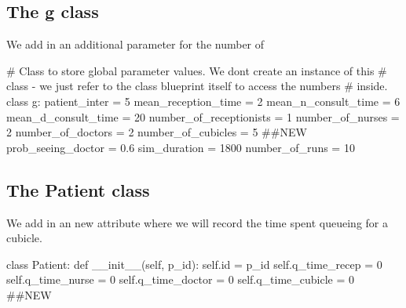 \documentclass[
  letterpaper,
  DIV=11,
  numbers=noendperiod]{scrreprt}
\newenvironment{Shaded}{}{}
\newcommand{\BuiltInTok}[1]{\textcolor[rgb]{0.84,0.23,0.29}{#1}}
\newcommand{\CommentTok}[1]{\textcolor[rgb]{0.42,0.45,0.49}{#1}}
\newcommand{\DecValTok}[1]{\textcolor[rgb]{0.00,0.36,0.77}{#1}}
\newcommand{\FloatTok}[1]{\textcolor[rgb]{0.00,0.36,0.77}{#1}}
\newcommand{\FunctionTok}[1]{\textcolor[rgb]{0.44,0.26,0.76}{#1}}
\newcommand{\KeywordTok}[1]{\textcolor[rgb]{0.84,0.23,0.29}{#1}}
\newcommand{\NormalTok}[1]{\textcolor[rgb]{0.14,0.16,0.18}{#1}}
\newcommand{\OperatorTok}[1]{\textcolor[rgb]{0.14,0.16,0.18}{#1}}
\newcommand{\VariableTok}[1]{\textcolor[rgb]{0.89,0.38,0.04}{#1}}
\begin{document}
\subsection{The g class}\label{the-g-class-9}

We add in an additional parameter for the number of

\begin{Shaded}
\begin{Highlighting}[]
\CommentTok{\# Class to store global parameter values.  We don\textquotesingle{}t create an instance of this}
\CommentTok{\# class {-} we just refer to the class blueprint itself to access the numbers}
\CommentTok{\# inside.}
\KeywordTok{class}\NormalTok{ g:}
\NormalTok{    patient\_inter }\OperatorTok{=} \DecValTok{5}
\NormalTok{    mean\_reception\_time }\OperatorTok{=} \DecValTok{2}
\NormalTok{    mean\_n\_consult\_time }\OperatorTok{=} \DecValTok{6}
\NormalTok{    mean\_d\_consult\_time }\OperatorTok{=} \DecValTok{20}
\NormalTok{    number\_of\_receptionists }\OperatorTok{=} \DecValTok{1}
\NormalTok{    number\_of\_nurses }\OperatorTok{=} \DecValTok{2}
\NormalTok{    number\_of\_doctors }\OperatorTok{=} \DecValTok{2}
\NormalTok{    number\_of\_cubicles }\OperatorTok{=} \DecValTok{5} \CommentTok{\#\#NEW}
\NormalTok{    prob\_seeing\_doctor }\OperatorTok{=} \FloatTok{0.6}
\NormalTok{    sim\_duration }\OperatorTok{=} \DecValTok{1800}
\NormalTok{    number\_of\_runs }\OperatorTok{=} \DecValTok{10}
\end{Highlighting}
\end{Shaded}

\subsection{The Patient class}\label{the-patient-class-8}

We add in an new attribute where we will record the time spent queueing
for a cubicle.

\begin{Shaded}
\begin{Highlighting}[]
\KeywordTok{class}\NormalTok{ Patient:}
    \KeywordTok{def} \FunctionTok{\_\_init\_\_}\NormalTok{(}\VariableTok{self}\NormalTok{, p\_id):}
        \VariableTok{self}\NormalTok{.}\BuiltInTok{id} \OperatorTok{=}\NormalTok{ p\_id}
        \VariableTok{self}\NormalTok{.q\_time\_recep }\OperatorTok{=} \DecValTok{0}
        \VariableTok{self}\NormalTok{.q\_time\_nurse }\OperatorTok{=} \DecValTok{0}
        \VariableTok{self}\NormalTok{.q\_time\_doctor }\OperatorTok{=} \DecValTok{0}
        \VariableTok{self}\NormalTok{.q\_time\_cubicle }\OperatorTok{=} \DecValTok{0} \CommentTok{\#\#NEW}
\end{Highlighting}
\end{Shaded}
\end{document}
